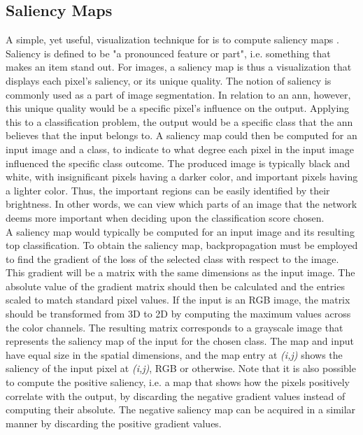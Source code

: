 \subsection{Saliency Maps}

A simple, yet useful, visualization technique for  is to compute saliency maps \cite{salience}. Saliency is defined to be "a pronounced feature or part", i.e. something that makes an item stand out. For images, a saliency map is thus a visualization that displays each pixel's saliency, or its unique quality. The notion of saliency is commonly used as a part of image segmentation. In relation to an \acrshort{ann}, however, this unique quality would be a specific pixel's influence on the output. Applying this to a classification problem, the output would be a specific class that the \acrshort{ann} believes that the input belongs to. A saliency map could then be computed for an input image and a class, to indicate to what degree each pixel in the input image influenced the specific class outcome. The produced image is typically black and white, with insignificant pixels having a darker color, and important pixels having a lighter color. Thus, the important regions can be easily identified by their brightness. In other words, we can view which parts of an image that the network deems more important when deciding upon the classification score chosen. \\

\noindent A saliency map would typically be computed for an input image and its resulting top classification. To obtain the saliency map, backpropagation must be employed to find the gradient of the loss of the selected class with respect to the image. This gradient will be a matrix with the same dimensions as the input image. The absolute value of the gradient matrix should then be calculated and the entries scaled to match standard pixel values. If the input is an RGB image, the matrix should be transformed from 3D to 2D by computing the maximum values across the color channels. The resulting matrix corresponds to a grayscale image that represents the saliency map of the input for the chosen class. The map and input have equal size in the spatial dimensions, and the map entry at \textit{(i,j)} shows the saliency of the input pixel at \textit{(i,j)}, RGB or otherwise. Note that it is also possible to compute the positive saliency, i.e. a map that shows how the pixels positively correlate with the output, by discarding the negative gradient values instead of computing their absolute. The negative saliency map can be acquired in a similar manner by discarding the positive gradient values.

